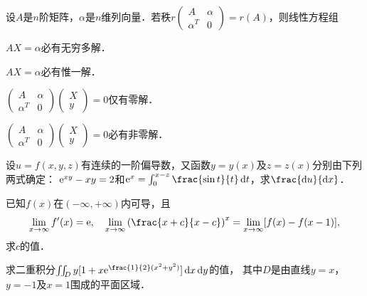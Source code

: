\documentclass[plain,noanswer,medmath]{../../template/jnuexam}
\begin{document}
\begin{problem}
设$A$是$n$阶矩阵，$\alpha$是$n$维列向量．若秩$r\begin{pmatrix}
         A & \alpha \\
  \alpha^T & 0
\end{pmatrix} = r(A)$，则线性方程组\pickout{}
\begin{abcd}
\item $AX = \alpha$必有无穷多解．
\item $AX = \alpha$必有惟一解．
\item $\begin{pmatrix}
         A & \alpha \\
  \alpha^T & 0
\end{pmatrix}\begin{pmatrix}
  X \\
  y
\end{pmatrix} = 0$仅有零解．
\item $\begin{pmatrix}
         A & \alpha \\
  \alpha^T & 0
\end{pmatrix}\begin{pmatrix}
  X \\
  y
\end{pmatrix} = 0$必有非零解．
\end{abcd}
\end{problem}





\begin{problem}
设$u = f(x,y,z)$有连续的一阶偏导数，又函数$y = y(x)$及$z = z(x)$分别由下列两式确定：
$\mathrm{e}^{xy} - xy = 2$和$\e^x = \int_0^{x - z} \frac{\sin t}{t} \dt$，求$\frac{\du}{\dx}$．
\end{problem}



\begin{problem}
已知$f(x)$在$(-\infty , +\infty)$内可导，且
$$\lim_{x \to \infty} f'(x) = \e,\quad
  \lim_{x \to \infty} \left(\frac{x + c}{x - c} \right)^x= \lim_{x \to \infty} [f(x) - f(x - 1)],$$
求$c$的值．
\end{problem}



\begin{problem}
求二重积分$\iint_D y[1 + x\e^{\frac{1}{2}(x^2 + y^2)}]\dx\dy$的值，
其中$D$是由直线$y = x$，$y = - 1$及$x = 1$围成的平面区域．
\end{problem}
\end{document}

